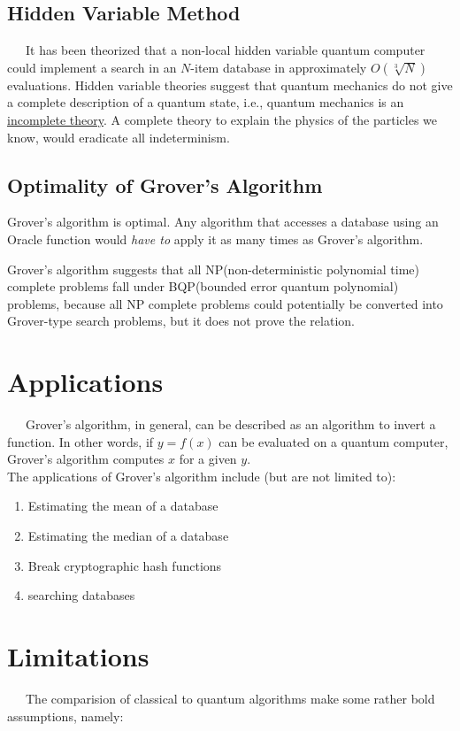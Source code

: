 \documentclass[a4paper]{article}
\begin{document}
\subsection{Hidden Variable Method}
~~~It has been theorized that a non-local hidden variable quantum computer could implement
a search in an $N$-item database in approximately $O(\sqrt[3]{N})$ evaluations. Hidden
variable theories suggest that quantum mechanics do not give a complete description
of a quantum state, i.e., quantum mechanics is an \underline{incomplete theory}. A complete
theory to explain the physics of the particles we know, would eradicate all indeterminism.

\subsection{Optimality of Grover's Algorithm}
Grover's algorithm is optimal. Any algorithm that accesses a database using an Oracle
function would \textit{have to} apply it as many times as Grover's algorithm.
\\
\par
Grover's algorithm suggests that all NP(non-deterministic polynomial time) 
complete problems fall under BQP(bounded error quantum polynomial) problems, because
all NP complete problems could potentially be converted into Grover-type search problems,
but it does not prove the relation.

\pagebreak


\section{ Applications }
~~~Grover's algorithm, in general, can be described as an algorithm to invert a function.
In other words, if $y = f(x)$ can be evaluated on a quantum computer, Grover's algorithm
computes $x$ for a given $y$.
\\
The applications of Grover's algorithm include (but are not limited to):
\begin{enumerate}
        \item Estimating the mean of a database
        \item Estimating the median of a database 
        \item Break cryptographic hash functions 
        \item searching databases
\end{enumerate}

\section { Limitations }
~~~The comparision of classical to quantum algorithms make some rather bold assumptions,
namely:
\end{document}
